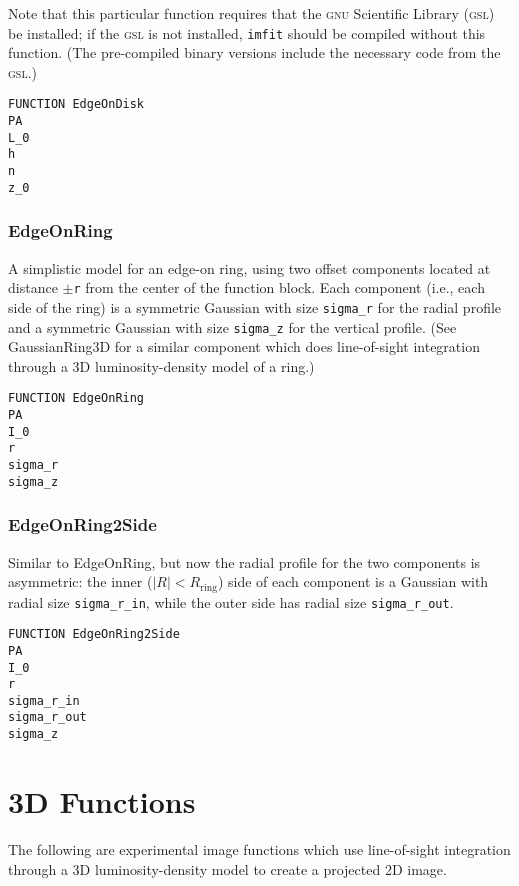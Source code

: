 \documentclass[10pt,a4paper,article]{memoir}
\newcommand{\imfit}{\texttt{imfit}}
\begin{document}
Note that this particular function requires that the \textsc{gnu} Scientific Library
(\textsc{gsl}) be installed; if the \textsc{gsl} is not installed, \imfit{} should be compiled
without this function. (The pre-compiled binary versions include the necessary
code from the \textsc{gsl}.)

\begin{verbatim}
FUNCTION EdgeOnDisk
PA
L_0
h
n
z_0
\end{verbatim}


\subsubsection{EdgeOnRing}

A simplistic model for an edge-on ring, using two offset components located
at distance $\pm$\texttt{r} from the center of the function block. Each component
(i.e., each side of the ring) is a symmetric Gaussian with size
\texttt{sigma\_r} for the radial profile and a symmetric Gaussian with
size \texttt{sigma\_z} for the vertical profile. (See GaussianRing3D for a similar
component which does line-of-sight integration through a 3D luminosity-density
model of a ring.)

\begin{verbatim}
FUNCTION EdgeOnRing
PA
I_0
r
sigma_r
sigma_z
\end{verbatim}


\subsubsection{EdgeOnRing2Side}

Similar to EdgeOnRing, but now the radial profile for the two components is
asymmetric: the inner ($|R| < R_{\mathrm{ring}}$) side of each component is a Gaussian
with radial size \texttt{sigma\_r\_in}, while the outer side has radial size
\texttt{sigma\_r\_out}.

\begin{verbatim}
FUNCTION EdgeOnRing2Side
PA
I_0
r
sigma_r_in
sigma_r_out
sigma_z
\end{verbatim}


\section{3D Functions}

The following are experimental image functions which use line-of-sight
integration through a 3D luminosity-density model to create a projected 2D
image.
\end{document}
